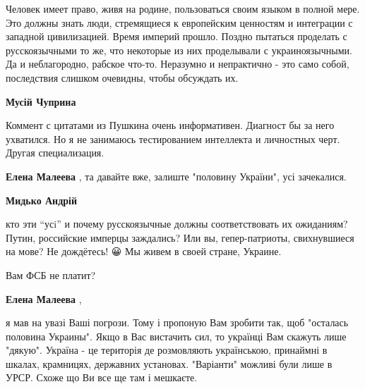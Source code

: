 \begin{itemize}
\begin{itemize}
Человек имеет право, живя на родине, пользоваться своим языком в полной мере.
Это должны знать люди, стремящиеся к европейским ценностям и интеграции с
западной цивилизацией. Время империй прошло. Поздно пытаться проделать с
русскоязычными то же, что некоторые из них проделывали с украиноязычными. Да и
неблагородно, рабское что-то. Неразумно и непрактично - это само собой,
последствия слишком очевидны, чтобы обсуждать их.


 
\textbf{Мусій Чуприна} 

Коммент с цитатами из Пушкина очень информативен. Диагност бы за него
ухватился. Но я не занимаюсь тестированием интеллекта и личностных черт. Другая
специализация.

 
\textbf{Елена Малеева} , та давайте вже, залиште "половину України", усі зачекалися.

 
\textbf{Мидько Андрій} 

кто эти “усi” и почему русскоязычные должны соответствовать их ожиданиям?
Путин, российские имперцы заждались? Или вы, гепер-патриоты, свихнувшиеся на
мове? Не дождётесь! 😀 Мы живем в своей стране, Украине.

Вам ФСБ не платит?

 
\textbf{Елена Малеева} , 

я мав на увазі Ваші погрози. Тому і пропоную Вам зробити так, щоб "осталась
половина Украины". Якщо в Вас вистачить сил, то українці Вам скажуть лише
"дякую". Україна - це територія де розмовляють українською, принаймні в шкалах,
крамницях, державних установах. "Варіанти" можливі були лише в УРСР. Схоже що
Ви все ще там і мешкаєте.



\end{itemize}
\end{itemize}
